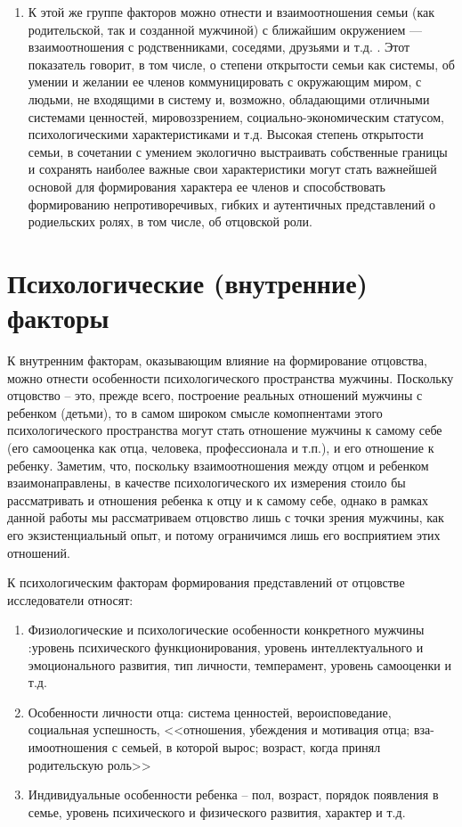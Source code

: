 \documentclass{../../common/thesisbyxetex}
\begin{document}
\begin{enumerate}
\item К этой же группе факторов можно отнести и взаимоотношения семьи (как родительской, так и
созданной мужчиной) с ближайшим окружением --- взаимоотношения с родственниками, соседями, друзьями
и т.д. \cite[40]{otage}. Этот показатель говорит, в том числе, о степени открытости семьи как
системы, об умении и желании ее членов коммуницировать с окружающим миром, с людьми, не входящими в
систему и, возможно, обладающими отличными системами ценностей, мировоззрением,
социально-экономическим статусом, психологическими характеристиками и т.д. Высокая степень
открытости семьи, в сочетании с умением экологично выстраивать собственные границы и сохранять
наиболее важные свои характеристики могут стать важнейшей основой для формирования характера
ее членов и способствовать формированию непротиворечивых, гибких и аутентичных представлений о
родиельских ролях, в том числе, об отцовской роли.

\end{enumerate}

\section{Психологические (внутренние) факторы}

К внутренним факторам, оказывающим влияние на формирование отцовства, можно отнести  особенности
психологического пространства мужчины. Поскольку отцовство -- это, прежде всего, построение
реальных отношений мужчины с ребенком (детьми), то в самом широком смысле комопнентами этого
психологического пространства могут стать отношение мужчины к самому себе (его самооценка как отца,
человека, профессионала и т.п.), и его отношение к ребенку. Заметим, что, поскольку взаимоотношения
между отцом и ребенком взаимонаправлены, в качестве психологического их измерения стоило бы
рассматривать и отношения ребенка к отцу и к самому себе, однако в рамках данной работы мы
рассматриваем отцовство лишь с точки зрения мужчины, как его экзистенциальный опыт, и потому
ограничимся лишь его восприятием этих отношений.

К психологическим факторам формирования представлений от отцовстве исследователи относят:

\begin{enumerate}
\item  Физиологические и психологические особенности конкретного мужчины :уровень психического
функционирования,
уровень интеллектуального и эмоционального развития, тип личности, темперамент, уровень самооценки
и т.д.

\item Особенности личности отца: система ценностей, вероисповедание, социальная
успешность, <<отношения, убеждения и мотивация отца; вза-
имоотношения с семьей, в которой вырос; возраст,
когда принял родительскую роль>> \cite[40]{otage}

\item Индивидуальные особенности ребенка -- пол, возраст, порядок появления в семье, уровень
психического и физического развития, характер и т.д.

\end{enumerate}
\end{document}
